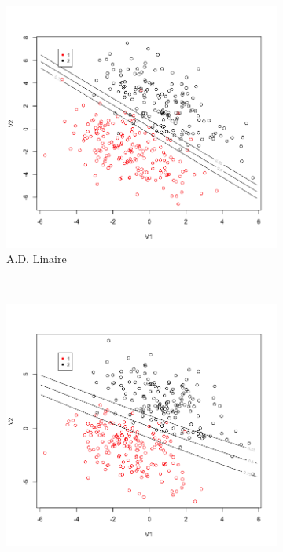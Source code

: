 \documentclass[a4paper,10pt]{report}
\begin{document}
\begin{figure}[H]
\begin{subfigure}[b]{0.45\linewidth}
		\includegraphics[width=1\linewidth]{img/front-decision-synth-3-adl}
		\caption{\small A.D. Linaire}
		\label{fig:front-decision-synth-3-adl}%
	\end{subfigure}\\%
	\begin{subfigure}[b]{0.45\linewidth}
		\centering
		\captionsetup{justification=centering, margin=1cm}
		\includegraphics[width=1\linewidth]{img/front-decision-synth-3-nba}

\end{subfigure}
\end{figure}
\end{document}
